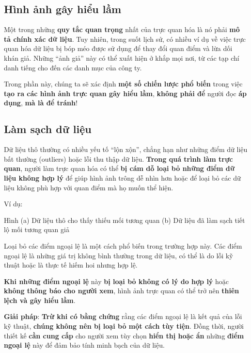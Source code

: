 \subsection{Hình ảnh gây hiểu
lầm}\label{huxecnh-ux1ea3nh-guxe2y-hiux1ec3u-lux1ea7m}

Một trong những \textbf{quy tắc quan trọng} nhất của trực quan hóa là nó
phải \textbf{mô tả chính xác dữ liệu}. Tuy nhiên, trong suốt lịch sử, có
nhiều ví dụ về việc trực quan hóa dữ liệu bị bóp méo được sử dụng để
thay đổi quan điểm và lừa dối khán giả. Những ``ảnh giả'' này có thể
xuất hiện ở khắp mọi nơi, từ các tạp chí danh tiếng cho đến các danh mục
của công ty.

Trong phần này, chúng ta sẽ xác định \textbf{một số chiến lược phổ biến}
trong việc \textbf{tạo ra các hình ảnh trực quan gây hiểu lầm},
\textbf{không phải để} người đọc \textbf{áp dụng}, \textbf{mà là để
tránh}!

\subsection{Làm sạch dữ liệu}\label{luxe0m-sux1ea1ch-dux1eef-liux1ec7u}

Dữ liệu thô thường có nhiều yếu tố ``lộn xộn'', chẳng hạn như những điểm
dữ liệu bất thường (outliers) hoặc lỗi thu thập dữ liệu. \textbf{Trong
quá trình làm trực quan}, người làm trực quan hóa có thể \textbf{bị cám
dỗ loại bỏ những điểm dữ liệu không hợp lý} để giúp hình ảnh trông dễ
nhìn hơn hoặc để loại bỏ các dữ liệu không phù hợp với quan điểm mà họ
muốn thể hiện.

Ví dụ:

Hình (a) Dữ liệu thô cho thấy thiếu mối tương quan (b) Dữ liệu đã làm
sạch tiết lộ mối tương quan giả

Loại bỏ các điểm ngoại lệ là một cách phổ biến trong trường hợp này. Các
điểm ngoại lệ là những giá trị không bình thường trong dữ liệu, có thể
là do lỗi kỹ thuật hoặc là thực tế hiếm hoi nhưng hợp lệ.

\textbf{Khi những điểm ngoại lệ} này \textbf{bị loại bỏ không có lý do
hợp lý} hoặc \textbf{không thông báo cho người xem}, hình ảnh trực quan
có thể trở nên \textbf{thiên lệch và gây hiểu lầm}.

\textbf{Giải pháp}: \textbf{Trừ khi có bằng chứng} rằng các điểm ngoại
lệ là kết quả của lỗi kỹ thuật, \textbf{chúng không nên bị loại bỏ một
cách tùy tiện}. Đồng thời, người thiết kế \textbf{cần cung cấp} cho
người xem tùy chọn \textbf{hiển thị hoặc ẩn} những \textbf{điểm ngoại
lệ} này để đảm bảo tính minh bạch của dữ liệu.

